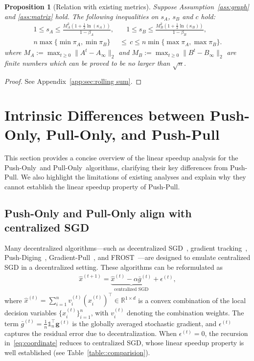 \documentclass[10pt]{article}
\newcommand{\one}{\mathds{1}_n}
\newcommand{\vg}{{\mathbf{g}}}
\newcommand{\pushonly}{{\sc Push-Only}\xspace}
\newcommand{\pushpull}{{\sc Push-Pull}\xspace}
\newcommand{\pullonly}{{\sc Pull-Only}\xspace}
\newtheorem{proposition}[thm]{Proposition}
\begin{document}
\begin{proposition}[\sc\small Relation with existing metrics]\label{prop:s_A,s_B}
Suppose Assumption~\ref{ass:graph} and \ref{ass:matrix} hold.
The following inequalities on $s_A$, $s_B$ and $c$ hold:
    \begin{align*}
    1\le s_A\le \frac{M_A^2(1+\frac{1}{2}\ln(\kappa_A))}{1-\beta_A},&\quad 1\le s_B \le \frac{M_B^2(1+\frac{1}{2}\ln(\kappa_B))}{1-\beta_B},\\
    n\max\{\min \pi_A, \min \pi_B\}&\le  \,c \le n\min\{\max \pi_A, \max \pi_B\}. 
\end{align*}
where \( M_A := \max_{t \ge 0} \|A^t - A_\infty\|_2 \) and \( M_B := \max_{t \ge 0} \|B^t - B_\infty\|_2 \) are finite numbers which can be proved to be no larger than $\sqrt{n}$. 
\end{proposition}
\begin{proof}
    See Appendix~\ref{app:sec:rolling sum}.
\end{proof} 

\section{Intrinsic Differences between Push-Only, Pull-Only, and Push-Pull}\label{sec:Preliminary}
This section provides a concise overview of the linear speedup analysis for the \pushonly\ and \pullonly\ algorithms, clarifying their key differences from \pushpull. We also highlight the limitations of existing analyses and explain why they cannot establish the linear speedup property of \pushpull.

\vspace{1mm}
\subsection{Push-Only and Pull-Only align with centralized SGD}
Many decentralized algorithms---such as decentralized SGD~\cite{koloskova2020unified}, gradient tracking~\cite{xu2015augmented,di2016next,qu2017harnessing}, 
Push-Diging~\cite{Nedic2017pushdiging}, Gradient-Pull~\cite{mai2016distributed}, and FROST~\cite{FROST-Xinran}---are designed to emulate centralized SGD in a decentralized setting. These algorithms can be reformulated as
\begin{align}
    \hat{x}^{(t+1)} = \underbrace{\hat{x}^{(t)} - \alpha \bar{g}^{(t)}}_{\text{centralized SGD}} + \epsilon^{(t)}, \label{eq:coordinate}
\end{align}
where $\hat{x}^{(t)} = \sum_{i=1}^n v_i^{(t)} (x_i^{(t)})^\top \in \mathbb{R}^{1 \times d}$ is a convex combination of the local decision variables $\{x_i^{(t)}\}_{i=1}^n$, with $v_i^{(t)}$ denoting the combination weights. The term $\bar{g}^{(t)} = \tfrac{1}{n}\one^\top \vg^{(t)}$ is the globally averaged stochastic gradient, and $\epsilon^{(t)}$ captures the residual error due to decentralization. When $\epsilon^{(t)}=0$, the recursion in~\eqref{eq:coordinate} reduces to centralized SGD, whose linear speedup property is well established (see Table~\ref{table::comparision}).
\end{document}
